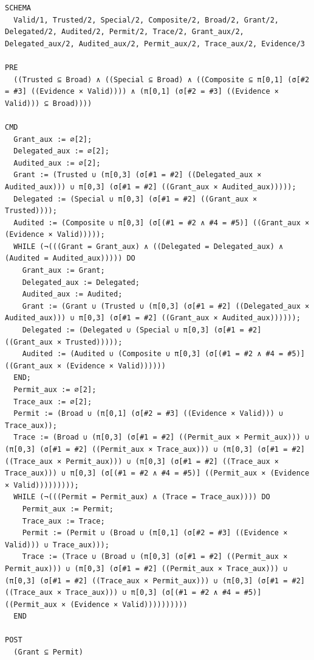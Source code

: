\documentclass[10pt]{article}
\begin{document}
\begin{Verbatim}[fontsize=\scriptsize,breaklines=true,breakanywhere=true,frame=single,framesep=1.5mm]
SCHEMA
  Valid/1, Trusted/2, Special/2, Composite/2, Broad/2, Grant/2, Delegated/2, Audited/2, Permit/2, Trace/2, Grant_aux/2, Delegated_aux/2, Audited_aux/2, Permit_aux/2, Trace_aux/2, Evidence/3

PRE
  ((Trusted ⊆ Broad) ∧ ((Special ⊆ Broad) ∧ ((Composite ⊆ π[0,1] (σ[#2 = #3] ((Evidence × Valid)))) ∧ (π[0,1] (σ[#2 = #3] ((Evidence × Valid))) ⊆ Broad))))

CMD
  Grant_aux := ∅[2];
  Delegated_aux := ∅[2];
  Audited_aux := ∅[2];
  Grant := (Trusted ∪ (π[0,3] (σ[#1 = #2] ((Delegated_aux × Audited_aux))) ∪ π[0,3] (σ[#1 = #2] ((Grant_aux × Audited_aux)))));
  Delegated := (Special ∪ π[0,3] (σ[#1 = #2] ((Grant_aux × Trusted))));
  Audited := (Composite ∪ π[0,3] (σ[(#1 = #2 ∧ #4 = #5)] ((Grant_aux × (Evidence × Valid)))));
  WHILE (¬(((Grant = Grant_aux) ∧ ((Delegated = Delegated_aux) ∧ (Audited = Audited_aux))))) DO
    Grant_aux := Grant;
    Delegated_aux := Delegated;
    Audited_aux := Audited;
    Grant := (Grant ∪ (Trusted ∪ (π[0,3] (σ[#1 = #2] ((Delegated_aux × Audited_aux))) ∪ π[0,3] (σ[#1 = #2] ((Grant_aux × Audited_aux))))));
    Delegated := (Delegated ∪ (Special ∪ π[0,3] (σ[#1 = #2] ((Grant_aux × Trusted)))));
    Audited := (Audited ∪ (Composite ∪ π[0,3] (σ[(#1 = #2 ∧ #4 = #5)] ((Grant_aux × (Evidence × Valid))))))
  END;
  Permit_aux := ∅[2];
  Trace_aux := ∅[2];
  Permit := (Broad ∪ (π[0,1] (σ[#2 = #3] ((Evidence × Valid))) ∪ Trace_aux));
  Trace := (Broad ∪ (π[0,3] (σ[#1 = #2] ((Permit_aux × Permit_aux))) ∪ (π[0,3] (σ[#1 = #2] ((Permit_aux × Trace_aux))) ∪ (π[0,3] (σ[#1 = #2] ((Trace_aux × Permit_aux))) ∪ (π[0,3] (σ[#1 = #2] ((Trace_aux × Trace_aux))) ∪ π[0,3] (σ[(#1 = #2 ∧ #4 = #5)] ((Permit_aux × (Evidence × Valid)))))))));
  WHILE (¬(((Permit = Permit_aux) ∧ (Trace = Trace_aux)))) DO
    Permit_aux := Permit;
    Trace_aux := Trace;
    Permit := (Permit ∪ (Broad ∪ (π[0,1] (σ[#2 = #3] ((Evidence × Valid))) ∪ Trace_aux)));
    Trace := (Trace ∪ (Broad ∪ (π[0,3] (σ[#1 = #2] ((Permit_aux × Permit_aux))) ∪ (π[0,3] (σ[#1 = #2] ((Permit_aux × Trace_aux))) ∪ (π[0,3] (σ[#1 = #2] ((Trace_aux × Permit_aux))) ∪ (π[0,3] (σ[#1 = #2] ((Trace_aux × Trace_aux))) ∪ π[0,3] (σ[(#1 = #2 ∧ #4 = #5)] ((Permit_aux × (Evidence × Valid))))))))))
  END

POST
  (Grant ⊆ Permit)
\end{Verbatim}

\Needspace{0.45\textheight}
\end{document}
